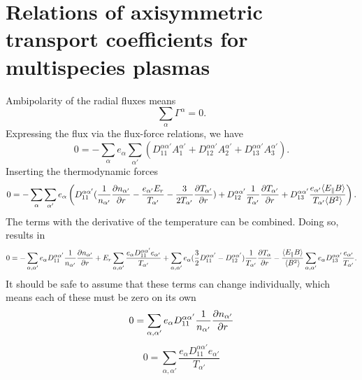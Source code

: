 \section{Relations of axisymmetric transport coefficients for multispecies plasmas}
Ambipolarity of the radial fluxes means
\begin{equation}
  \sum_{\alpha} \Gamma^{\alpha} = 0.
\end{equation}
Expressing the flux via the flux-force relations, we have
\begin{equation}
  0 = - \sum_{\alpha} e_{\alpha} \sum_{\alpha'} \left( D_{11}^{\alpha\alpha'} A_{1}^{\alpha'} + D_{12}^{\alpha\alpha'} A_{2}^{\alpha'} + D_{13}^{\alpha\alpha'} A_{3}^{\alpha'}\right).
\end{equation}
Inserting the thermodynamic forces
\begin{equation}
  0 = - \sum_{\alpha} \sum_{\alpha'} e_{\alpha} \left( D_{11}^{\alpha\alpha'} (\frac{1}{n_{\alpha'}} \frac{\partial n_{\alpha'}}{\partial r} - \frac{e_{\alpha'} E_r}{T_{\alpha'}} - \frac{3}{2 T_{\alpha'}} \frac{\partial T_{\alpha'}}{\partial r})
    + D_{12}^{\alpha\alpha'} \frac{1}{T_{\alpha'}} \frac{\partial T_{\alpha'}}{\partial r} + D_{13}^{\alpha\alpha'} \frac{e_{\alpha'} \langle E_{\parallel} B \rangle}{T_{\alpha'} \langle B^2 \rangle} \right).
\end{equation}
The terms with the derivative of the temperature can be combined. Doing
so, results in
\begin{equation}
  0 = - \sum_{\alpha, \alpha'} e_{\alpha} D_{11}^{\alpha\alpha'} \frac{1}{n_{\alpha'}} \frac{\partial n_{\alpha'}}{\partial r}
      + E_r \sum_{\alpha, \alpha'} \frac{e_{\alpha} D_{11}^{\alpha\alpha'} e_{\alpha'}}{T_{\alpha'}}
      + \sum_{\alpha, \alpha'} e_{\alpha} (\frac{3}{2} D_{11}^{\alpha\alpha'} - D_{12}^{\alpha\alpha'}) \frac{1}{T_{\alpha'}} \frac{\partial T_{\alpha}}{\partial r}
      - \frac{\langle E_{\parallel} B \rangle}{\langle B^2 \rangle} \sum_{\alpha, \alpha'} e_{\alpha} D_{13}^{\alpha\alpha'} \frac{e_{\alpha'}}{T_{\alpha'}}.
\end{equation}
It should be safe to assume that these terms can change individually,
which means each of these must be zero on its own
\begin{equation}
  0 = \sum_{\alpha, \alpha'} e_{\alpha} D_{11}^{\alpha\alpha'} \frac{1}{n_{\alpha'}} \frac{\partial n_{\alpha'}}{\partial r}
\end{equation}
\begin{equation}
  0 = \sum_{\alpha, \alpha'} \frac{e_{\alpha} D_{11}^{\alpha\alpha'} e_{\alpha'}}{T_{\alpha'}}\label{eq_ambipolarity_condition_from_radial_electric_field}
\end{equation}
